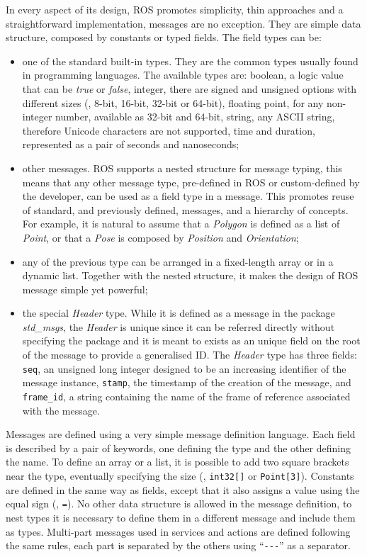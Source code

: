 In every aspect of its design, ROS promotes simplicity, thin approaches and a straightforward implementation, messages are no exception. They are simple data structure, composed by constants or typed fields. The field types can be:
\begin{itemize}
\item one of the standard built-in types. They are the common types usually found in programming languages. The available types are: boolean, a logic value that can be \textit{true} or \textit{false}, integer, there are signed and unsigned options with different sizes (\ie, 8-bit, 16-bit, 32-bit or 64-bit), floating point, for any non-integer number, available as 32-bit and 64-bit, string, any ASCII string, therefore Unicode characters are not supported, time and duration, represented as a pair of seconds and nanoseconds;
\item other messages. ROS supports a nested structure for message typing, this means that any other message type, pre-defined in ROS or custom-defined by the developer, can be used as a field type in a message. This promotes reuse of standard, and previously defined, messages, and a hierarchy of concepts. For example, it is natural to assume that a \textit{Polygon} is defined as a list of \textit{Point}, or that a \textit{Pose} is composed by \textit{Position} and \textit{Orientation};
\item any of the previous type can be arranged in a fixed-length array or in a dynamic list. Together with the nested structure, it makes the design of ROS message simple yet powerful;
\item the special \textit{Header} type. While it is defined as a message in the package \textit{std\_msgs}, the \textit{Header} is unique since it can be referred directly without specifying the package and it is meant to exists as an unique field on the root of the message to provide a generalised ID. The \textit{Header} type has three fields: \texttt{seq}, an unsigned long integer designed to be an increasing identifier of the message instance, \texttt{stamp}, the timestamp of the creation of the message, and \texttt{frame\_id}, a string containing the name of the frame of reference associated with the message.
\end{itemize}

Messages are defined using a very simple message definition language. Each field is described by a pair of keywords, one defining the type and the other defining the name. To define an array or a list, it is possible to add two square brackets near the type, eventually specifying the size (\eg, \texttt{int32[]} or \texttt{Point[3]}). Constants are defined in the same way as fields, except that it also assigns a value using the equal sign (\ie, \texttt{=}). No other data structure is allowed in the message definition, to nest types it is necessary to define them in a different message and include them as types. Multi-part messages used in services and actions are defined following the same rules, each part is separated by the others using ``\texttt{-{}-{}-}'' as a separator.

